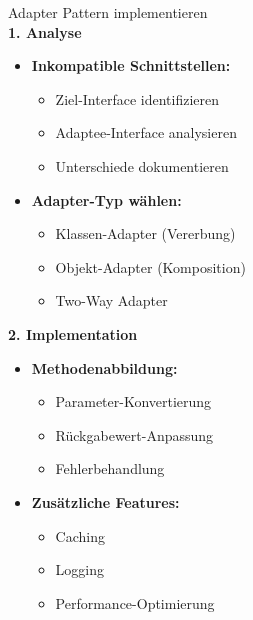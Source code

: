 \begin{KR}{Adapter Pattern implementieren}\\
\textbf{1. Analyse}
\begin{itemize}
    \item \textbf{Inkompatible Schnittstellen:}
    \begin{itemize}
        \item Ziel-Interface identifizieren
        \item Adaptee-Interface analysieren
        \item Unterschiede dokumentieren
    \end{itemize}
    
    \item \textbf{Adapter-Typ wählen:}
    \begin{itemize}
        \item Klassen-Adapter (Vererbung)
        \item Objekt-Adapter (Komposition)
        \item Two-Way Adapter
    \end{itemize}
\end{itemize}

\textbf{2. Implementation}
\begin{itemize}
    \item \textbf{Methodenabbildung:}
    \begin{itemize}
        \item Parameter-Konvertierung
        \item Rückgabewert-Anpassung
        \item Fehlerbehandlung
    \end{itemize}
    
    \item \textbf{Zusätzliche Features:}
    \begin{itemize}
        \item Caching
        \item Logging
        \item Performance-Optimierung
    \end{itemize}
\end{itemize}
\end{KR}




